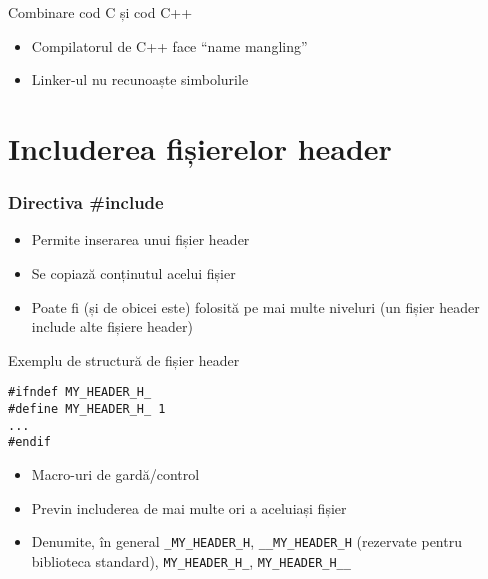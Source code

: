 \documentclass{beamer}
\begin{document}
\begin{frame}{Combinare cod C și cod C++}
	\begin{itemize}
		\pause \item Compilatorul de C++ face ``name mangling''
		\pause \item Linker-ul nu recunoaște simbolurile
	\end{itemize}
	\pause 
\end{frame}

\section{Includerea fișierelor header}

\frame{\tableofcontents[currentsection]}

\begin{frame}
	\frametitle{Directiva \#include}
	\begin{itemize}
		\item Permite inserarea unui fișier header
		\item Se copiază conținutul acelui fișier
		\item Poate fi (și de obicei este) folosită pe mai multe niveluri (un
fișier header include alte fișiere header)
	\end{itemize}
\end{frame}

\begin{frame}{Exemplu de structură de fișier header}
	\begin{beamerboxesrounded}[lower=block body,shadow=true]{}
		\texttt{\#ifndef MY\_HEADER\_H\_ \\
\#define MY\_HEADER\_H\_	1 \\
... \\
\#endif \\
}
	\end{beamerboxesrounded}
	\begin{itemize}
		\item Macro-uri de gardă/control
		\item Previn includerea de mai multe ori a aceluiași fișier
		\item Denumite, în general \texttt{\_MY\_HEADER\_H},
\texttt{\_\_MY\_HEADER\_H} (rezervate pentru biblioteca standard),
\texttt{MY\_HEADER\_H\_}, \texttt{MY\_HEADER\_H\_\_}
	\end{itemize}
\end{frame}
\end{document}
